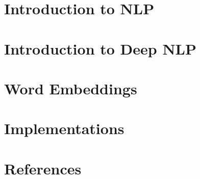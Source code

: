 \section[Intro]{Introduction to NLP}


\section[DNLP]{Introduction to Deep NLP}


\section[W2V]{Word Embeddings}





\section[Impl]{Implementations}


\section[Refs]{References}


